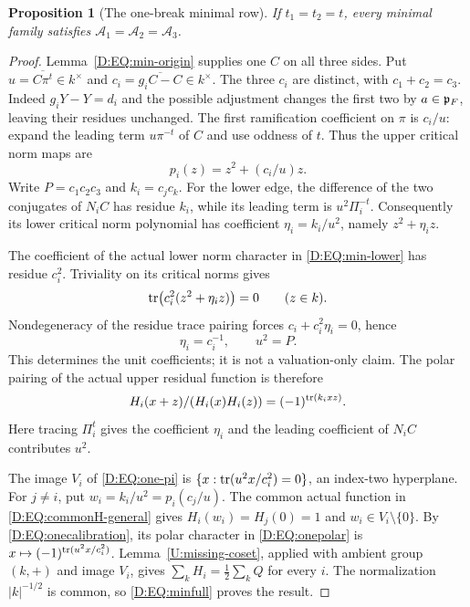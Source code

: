 \documentclass[11pt]{amsart}
\newtheorem{proposition}[theorem]{Proposition}
\theoremstyle{definition}
\theoremstyle{remark}
\begin{document}
\begin{proposition}[The one-break minimal row]\label{D:EQ:min-one}
If $t_1=t_2=t$, every minimal family satisfies
$\mathcal A_1=\mathcal A_2=\mathcal A_3$.
\end{proposition}
\begin{proof}
Lemma~\ref{D:EQ:min-origin} supplies one $C$ on all three sides.
Put $u=\overline{C\pi^t}\in k^\times$ and
$c_i=\overline{g_iC-C}\in k^\times$.
The three $c_i$ are distinct, with $c_1+c_2=c_3$.
Indeed $g_iY-Y=d_i$ and the possible adjustment changes the first two
by $a\in\mathfrak p_F$, leaving their residues unchanged.
The first ramification coefficient on $\pi$ is $c_i/u$:
expand the leading term $u\pi^{-t}$ of $C$ and use oddness of $t$.
Thus the upper critical norm maps are
\begin{equation}\label{D:EQ:one-pi}
 p_i(z)=z^2+(c_i/u)z.
\end{equation}
Write $P=c_1c_2c_3$ and $k_i=c_jc_k$.
For the lower edge, the difference of the two conjugates of $N_iC$
has residue $k_i$, while its leading term is $u^2\Pi_i^{-t}$.
Consequently its lower critical norm polynomial has coefficient
$\eta_i=k_i/u^2$, namely $z^2+\eta_i z$.

The coefficient of the actual lower norm character in
\eqref{D:EQ:min-lower} has residue $c_i^2$.
Triviality on its critical norms gives
\[
 \operatorname{tr}\bigl(c_i^2(z^2+\eta_i z)\bigr)=0\qquad(z\in k).
\]
Nondegeneracy of the residue trace pairing forces
$c_i+c_i^2\eta_i=0$, hence
\begin{equation}\label{D:EQ:onecalibration}
 \eta_i=c_i^{-1},\qquad u^2=P.
\end{equation}
This determines the unit coefficients; it is not a valuation-only claim.
The polar pairing of the actual upper residual function is therefore
\begin{equation}\label{D:EQ:onepolar}
 H_i(x+z)/(H_i(x)H_i(z))=(-1)^{\operatorname{tr}(k_i xz)}.
\end{equation}
Here tracing $\Pi_i^t$ gives the coefficient $\eta_i$ and the leading
coefficient of $N_iC$ contributes $u^2$.

The image $V_i$ of \eqref{D:EQ:one-pi} is
$\{x:\operatorname{tr}(u^2x/c_i^2)=0\}$, an index-two hyperplane.
For $j\ne i$, put $w_i=k_i/u^2=p_i(c_j/u)$.
The common actual function in \eqref{D:EQ:commonH-general} gives
$H_i(w_i)=H_j(0)=1$ and $w_i\in V_i\setminus\{0\}$.
By \eqref{D:EQ:onecalibration}, its polar character in \eqref{D:EQ:onepolar}
is $x\mapsto(-1)^{\operatorname{tr}(u^2x/c_i^2)}$.
Lemma~\ref{U:missing-coset}, applied with ambient group $(k,+)$
and image $V_i$, gives $\sum_kH_i=\frac12\sum_kQ$ for every $i$.
The normalization $|k|^{-1/2}$ is common, so
\eqref{D:EQ:minfull} proves the result.
\end{proof}
\end{document}
